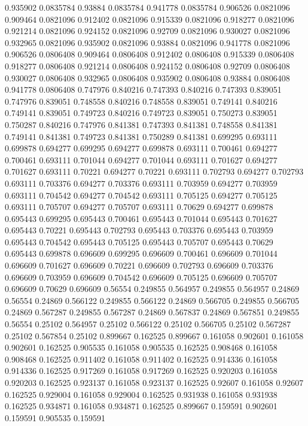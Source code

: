 0.935902 0.0835784
0.93884 0.0835784
0.941778 0.0835784
0.906526 0.0821096
0.909464 0.0821096
0.912402 0.0821096
0.915339 0.0821096
0.918277 0.0821096
0.921214 0.0821096
0.924152 0.0821096
0.92709 0.0821096
0.930027 0.0821096
0.932965 0.0821096
0.935902 0.0821096
0.93884 0.0821096
0.941778 0.0821096
0.906526 0.0806408
0.909464 0.0806408
0.912402 0.0806408
0.915339 0.0806408
0.918277 0.0806408
0.921214 0.0806408
0.924152 0.0806408
0.92709 0.0806408
0.930027 0.0806408
0.932965 0.0806408
0.935902 0.0806408
0.93884 0.0806408
0.941778 0.0806408
0.747976 0.840216
0.747393 0.840216
0.747393 0.839051
0.747976 0.839051
0.748558 0.840216
0.748558 0.839051
0.749141 0.840216
0.749141 0.839051
0.749723 0.840216
0.749723 0.839051
0.750273 0.839051
0.750287 0.840216
0.747976 0.841381
0.747393 0.841381
0.748558 0.841381
0.749141 0.841381
0.749723 0.841381
0.750289 0.841381
0.699295 0.693111
0.699878 0.694277
0.699295 0.694277
0.699878 0.693111
0.700461 0.694277
0.700461 0.693111
0.701044 0.694277
0.701044 0.693111
0.701627 0.694277
0.701627 0.693111
0.70221 0.694277
0.70221 0.693111
0.702793 0.694277
0.702793 0.693111
0.703376 0.694277
0.703376 0.693111
0.703959 0.694277
0.703959 0.693111
0.704542 0.694277
0.704542 0.693111
0.705125 0.694277
0.705125 0.693111
0.705707 0.694277
0.705707 0.693111
0.70629 0.694277
0.699878 0.695443
0.699295 0.695443
0.700461 0.695443
0.701044 0.695443
0.701627 0.695443
0.70221 0.695443
0.702793 0.695443
0.703376 0.695443
0.703959 0.695443
0.704542 0.695443
0.705125 0.695443
0.705707 0.695443
0.70629 0.695443
0.699878 0.696609
0.699295 0.696609
0.700461 0.696609
0.701044 0.696609
0.701627 0.696609
0.70221 0.696609
0.702793 0.696609
0.703376 0.696609
0.703959 0.696609
0.704542 0.696609
0.705125 0.696609
0.705707 0.696609
0.70629 0.696609
0.56554 0.249855
0.564957 0.249855
0.564957 0.24869
0.56554 0.24869
0.566122 0.249855
0.566122 0.24869
0.566705 0.249855
0.566705 0.24869
0.567287 0.249855
0.567287 0.24869
0.567837 0.24869
0.567851 0.249855
0.56554 0.25102
0.564957 0.25102
0.566122 0.25102
0.566705 0.25102
0.567287 0.25102
0.567854 0.25102
0.899667 0.162525
0.899667 0.161058
0.902601 0.161058
0.902601 0.162525
0.905535 0.161058
0.905535 0.162525
0.908468 0.161058
0.908468 0.162525
0.911402 0.161058
0.911402 0.162525
0.914336 0.161058
0.914336 0.162525
0.917269 0.161058
0.917269 0.162525
0.920203 0.161058
0.920203 0.162525
0.923137 0.161058
0.923137 0.162525
0.92607 0.161058
0.92607 0.162525
0.929004 0.161058
0.929004 0.162525
0.931938 0.161058
0.931938 0.162525
0.934871 0.161058
0.934871 0.162525
0.899667 0.159591
0.902601 0.159591
0.905535 0.159591
